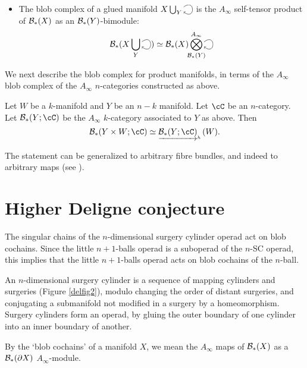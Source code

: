 \documentclass{pnastwo}
\begin{document}
\begin{article}
\begin{thm}
\begin{itemize}
\item The blob complex of a glued manifold $X\bigcup_Y \selfarrow$ is the $A_\infty$ self-tensor product of
${\mathcal B}_*(X)$ as an ${\mathcal B}_*(Y)$-bimodule:
\begin{equation*}
\bc_*(X\bigcup_Y \selfarrow) \simeq \bc_*(X) \Tensor^{A_\infty}_{\mathclap{\bc_*(Y)}} \selfarrow
\end{equation*}
\end{itemize}
\end{thm}


We next describe the blob complex for product manifolds, in terms of the $A_\infty$ blob complex of the $A_\infty$ $n$-categories constructed as above.

\begin{thm}
\label{thm:product}
Let $W$ be a $k$-manifold and $Y$ be an $n-k$ manifold.
Let $\cC$ be an $n$-category.
Let $\bc_*(Y;\cC)$ be the $A_\infty$ $k$-category associated to $Y$ as above.
Then
\[
	\bc_*(Y\times W; \cC) \simeq \clh{\bc_*(Y;\cC)}(W).
\]
\end{thm}
The statement can be generalized to arbitrary fibre bundles, and indeed to arbitrary maps
(see \cite[\S7.1]{1009.5025}).


\section{Higher Deligne conjecture}
\label{sec:applications}

\begin{thm}
\label{thm:deligne}
The singular chains of the $n$-dimensional surgery cylinder operad act on blob cochains.
Since the little $n{+}1$-balls operad is a suboperad of the $n$-SC operad,
this implies that the little $n{+}1$-balls operad acts on blob cochains of the $n$-ball.
\end{thm}

An $n$-dimensional surgery cylinder is a sequence of mapping cylinders and surgeries (Figure \ref{delfig2}), 
modulo changing the order of distant surgeries, and conjugating a submanifold not modified in a surgery by a homeomorphism. 
Surgery cylinders form an operad, by gluing the outer boundary of one cylinder into an inner boundary of another.

By the `blob cochains' of a manifold $X$, we mean the $A_\infty$ maps of ${\mathcal B}_*(X)$ as a ${\mathcal B}_*(\partial X)$ $A_\infty$-module.


\end{article}
\end{document}
